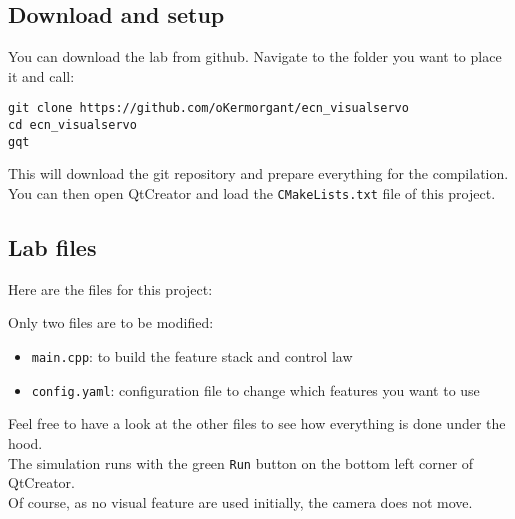 \documentclass{ecnreport}
\begin{document}
\subsection{Download and setup}

You can download the lab from github. Navigate to the folder you want to place it and call:
\begin{center}\bashstyle
\begin{lstlisting}
git clone https://github.com/oKermorgant/ecn_visualservo
cd ecn_visualservo
gqt
\end{lstlisting}
\end{center}

This will download the git repository and prepare everything for the compilation.\\
You can then open QtCreator and load the \texttt{CMakeLists.txt} file of this project.

\subsection{Lab files}

Here are the files for this project:

\begin{center}
\begin{minipage}{.4\linewidth}
\end{minipage}
\begin{minipage}{.55\linewidth}
 Only two files are to be modified:
 \begin{itemize}
  \item \texttt{main.cpp}: to build the feature stack and control law
  \item \texttt{config.yaml}: configuration file to change which features you want to use
 \end{itemize}
\end{minipage}
\end{center}

Feel free to have a look at the other files to see how everything is done under the hood.\\

The simulation runs with the green \texttt{Run} button on the bottom left corner of QtCreator.\\
Of course, as no visual feature are used initially, the camera does not move.
\end{document}

